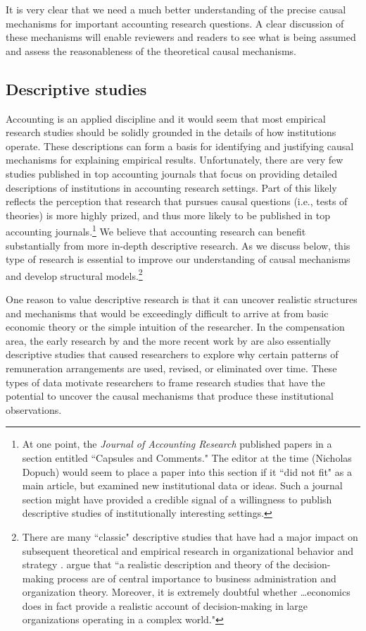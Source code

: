 \documentclass[12pt,reqno,titlepage]{amsart}
\theoremstyle{definition}
\begin{document}
\begin{doublespace}
It is very clear that we need a much better understanding of the precise causal mechanisms for important accounting research questions.
A clear discussion of these mechanisms will enable reviewers and readers to see what is being assumed and assess the reasonableness of the theoretical causal mechanisms.

\subsection{Descriptive studies} \label{sec:desc}

Accounting is an applied discipline and it would seem that most empirical research studies should be solidly grounded in the details of how institutions operate.
These descriptions can form a basis for identifying and justifying causal mechanisms for explaining empirical results.
Unfortunately, there are very few studies published in top accounting journals that focus on providing detailed descriptions of institutions in accounting research settings.
Part of this likely reflects the perception that research that pursues causal questions (i.e., tests of theories) is more highly prized, and thus more likely to be published in top accounting journals.\footnote{
At one point, the \emph{Journal of Accounting Research} published papers in a section entitled ``Capsules and Comments."
The editor at the time (Nicholas Dopuch) would seem to place a paper into this section if it ``did not fit" as a main article, but examined new institutional data or ideas. 
Such a journal section might have provided a credible signal of a willingness to publish descriptive studies of institutionally interesting settings.}
We believe that accounting research can benefit substantially from more in-depth descriptive research.
As we discuss below, this type of research is essential to improve our understanding of causal mechanisms and develop structural models.\footnote{
There are many ``classic" descriptive studies that have had a major impact on subsequent theoretical and empirical research in organizational behavior and strategy \citep[e.g.,][]{Cyert:1956fd,Bower:1986vd,Mintzberg1973nature}.
\citet{Cyert:1956fd} argue that ``a realistic description and theory of the decision-making process are of central importance to business administration and organization theory. Moreover, it is extremely doubtful whether \dots economics does in fact provide a realistic account of decision-making in large organizations operating in a complex world."}

One reason to value descriptive research is that it can uncover realistic structures and mechanisms that would be exceedingly difficult to arrive at from basic economic theory or the simple intuition of the researcher.
In the compensation area, the early research by \citet{Lewellyn:1968aa} and the more recent work by \citet{Frydman:2010bc} are also essentially descriptive studies that caused researchers to explore why certain patterns of remuneration arrangements are used, revised, or eliminated over time.
These types of data motivate researchers to frame research studies that have the potential to uncover the causal mechanisms that produce these institutional observations.


\end{doublespace}
\end{document}
